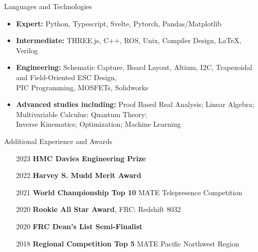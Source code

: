 \documentclass[]{mcdowellcv}
\begin{document}
\begin{cvsection}{Languages and Technologies}
	\begin{cvsubsection}{}{}{}
		\begin{itemize}
			\item \textbf{Expert:} Python, Typescript, Svelte, Pytorch, Pandas/Matplotlib
			\item \textbf{Intermediate:} THREE.js, C++, ROS, Unix, Compiler Design, LaTeX, Verilog
			\item \textbf{Engineering:} Schematic Capture, Board Layout, Altium, I2C,
			      Trapezoidal and Field-Oriented ESC Design, \\ PIC Programming, MOSFETs, Solidworks
			\item \textbf{Advanced studies including:} Proof Based Real Analysis; Linear Algebra; Multivariable Calculus; Quantum Theory; \\ Inverse Kinematics; Optimization; Machine Learning
		\end{itemize}
	\end{cvsubsection}
\end{cvsection}

\begin{cvsection}{Additional Experience and Awards}
	\begin{cvsubsection}{}{}{}
		\begin{itemize}
			\item[2023] \textbf{HMC Davies Engineering Prize}
			\item[2022] \textbf{Harvey S. Mudd Merit Award}
			\item[2021] \textbf{World Championship Top 10} MATE  Telepresence Competition
			\item[2020] \textbf{Rookie All Star Award}, FRC: Redshift 8032
			\item[2020] \textbf{FRC Dean's List Semi-Finalist}
			\item[2018] \textbf{Regional Competition Top 5} MATE Pacific Northwest Region
		\end{itemize}
	\end{cvsubsection}
\end{cvsection}
\end{document}
